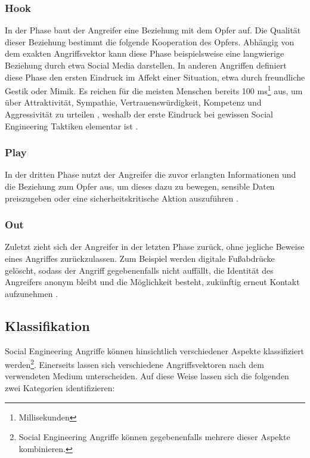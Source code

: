 \subsubsection{Hook}
In der  Phase baut der Angreifer eine Beziehung mit dem Opfer auf. Die Qualität dieser Beziehung bestimmt
die folgende Kooperation des Opfers. Abhängig von dem exakten Angriffsvektor kann diese Phase beispielsweise
eine langwierige Beziehung durch etwa Social Media darstellen. In anderen Angriffen definiert diese Phase den ersten
Eindruck im Affekt einer Situation, etwa durch freundliche Gestik oder Mimik. Es reichen für die meisten Menschen
bereits 100 ms\footnote{Millisekunden} aus, um über Attraktivität, Sympathie, Vertrauenswürdigkeit, Kompetenz und
Aggressivität zu urteilen , weshalb der erste Eindruck bei gewissen Social Engineering
Taktiken elementar ist .

\subsubsection{Play}
In der dritten Phase nutzt der Angreifer die zuvor erlangten Informationen und die Beziehung zum Opfer aus,
um dieses dazu zu bewegen, sensible Daten preiszugeben oder eine sicherheitskritische Aktion auszuführen .

\subsubsection{Out}
Zuletzt zieht sich der Angreifer in der letzten Phase zurück, ohne jegliche Beweise eines Angriffes zurückzulassen.
Zum Beispiel werden digitale Fußabdrücke gelöscht, sodass der Angriff gegebenenfalls nicht auffällt,
die Identität des Angreifers anonym bleibt und die Möglichkeit besteht, zukünftig erneut Kontakt aufzunehmen .

\subsection{Klassifikation}

Social Engineering Angriffe können hinsichtlich verschiedener Aspekte klassifiziert werden\footnote{Social Engineering Angriffe können gegebenenfalls mehrere dieser Aspekte kombinieren.}.
Einerseits lassen sich verschiedene Angriffsvektoren nach dem verwendeten Medium unterscheiden.
Auf diese Weise lassen sich die folgenden zwei Kategorien identifizieren:

